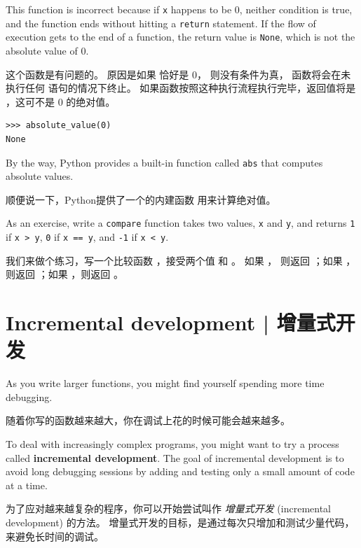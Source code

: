 %
This function is incorrect because if {\tt x} happens to be 0,
neither condition is true, and the function ends without hitting a
{\tt return} statement.  If the flow of execution gets to the end
of a function, the return value is {\tt None}, which is not
the absolute value of 0.

这个函数是有问题的。 原因是如果  恰好是 0， 则没有条件为真， 函数将会在未执行任何  语句的情况下终止。 如果函数按照这种执行流程执行完毕，返回值将是  ，这可不是 0 的绝对值。
  

\begin{lstlisting}
>>> absolute_value(0)
None
\end{lstlisting}

%
By the way, Python provides a built-in function called
{\tt abs} that computes absolute values.

顺便说一下，Python提供了一个的内建函数  用来计算绝对值。
  

As an exercise, write a {\tt compare} function
takes two values, {\tt x} and {\tt y}, and returns {\tt 1} if {\tt x > y},
{\tt 0} if {\tt x == y}, and {\tt -1} if {\tt x < y}.

我们来做个练习，写一个比较函数  ，接受两个值  和  。
如果 ， 则返回  ；如果 ， 则返回  ；如果 ，则返回  。
  


\section{Incremental development  |  增量式开发}
\label{incremental.development}

As you write larger functions, you might find yourself
spending more time debugging.

随着你写的函数越来越大，你在调试上花的时候可能会越来越多。

To deal with increasingly complex programs,
you might want to try a process called
{\bf incremental development}.  The goal of incremental development
is to avoid long debugging sessions by adding and testing only
a small amount of code at a time.

为了应对越来越复杂的程序，你可以开始尝试叫作 {\em 增量式开发} (incremental development) 的方法。 增量式开发的目标，是通过每次只增加和测试少量代码，来避免长时间的调试。
  

